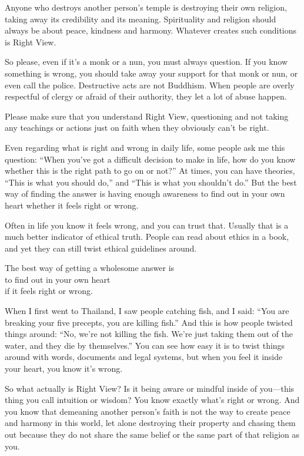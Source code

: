 \documentclass[12pt, openany]{book}
\newenvironment{aphorism}%
{%
\begin{center}\begin{itshape}
}%
{\end{itshape}\end{center}
}%
\begin{document}
Anyone who destroys another person’s temple is destroying their own religion, taking away its credibility and its meaning. Spirituality and religion should always be about peace, kindness and harmony. Whatever creates such conditions is Right View. 

So please, even if it’s a monk or a nun, you must always question. If you know something is wrong, you should take away your support for that monk or nun, or even call the police. Destructive acts are not Buddhism. When people are overly respectful of clergy or afraid of their authority, they let a lot of abuse happen. 

Please make sure that you understand Right View, questioning and not taking any teachings or actions just on faith when they obviously can’t be right. 

Even regarding what is right and wrong in daily life, some people ask me this question: “When you’ve got a difficult decision to make in life, how do you know whether this is the right path to go on or not?” At times, you can have theories, “This is what you should do,” and “This is what you shouldn’t do.” But the best way of finding the answer is having enough awareness to find out in your own heart whether it feels right or wrong. 

Often in life you know it feels wrong, and you can trust that. Usually that is a much better indicator of ethical truth. People can read about ethics in a book, and yet they can still twist ethical guidelines around. 

\newpage

\begin{aphorism}
The best way of getting a wholesome answer is\\  
to find out in your own heart\\ 
if it feels right or wrong.
\end{aphorism}

When I first went to Thailand, I saw people catching fish, and I said: “You are breaking your five precepts, you are killing fish.” And this is how people twisted things around: “No, we’re not killing the fish. We’re just taking them out of the water, and they die by themselves.” You can see how easy it is to twist things around with words, documents and legal systems, but when you feel it inside your heart, you know it’s wrong. 

So what actually is Right View? Is it being aware or mindful inside of you—this thing you call intuition or wisdom? You know exactly what’s right or wrong. And you know that demeaning another person’s faith is not the way to create peace and harmony in this world, let alone destroying their property and chasing them out because they do not share the same belief or the same part of that religion as you. 
\end{document}
